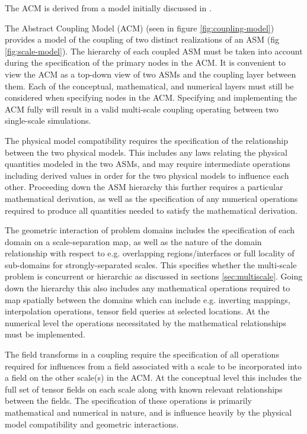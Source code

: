 \documentclass[review]{siamart1116}
\begin{document}
The ACM is derived from a model initially discussed in \cite{shephard2010component}.

The Abstract Coupling Model (ACM) (seen in figure \ref{fig:coupling-model}) provides a model of the coupling of two distinct realizations of an ASM (fig \ref{fig:scale-model}). The hierarchy of each coupled ASM must be taken into account during the specification of the primary nodes in the ACM. It is convenient to view the ACM as a top-down view of two ASMs and the coupling layer between them. Each of the conceptual, mathematical, and numerical layers must still be considered when specifying nodes in the ACM. Specifying and implementing the ACM fully will result in a valid multi-scale coupling operating between two single-scale simulations.

The physical model compatibility requires the specification of the relationship between the two physical models. This includes any laws relating the physical quantities modeled in the two ASMs, and may require intermediate operations including derived values in order for the two physical models to influence each other. Proceeding down the ASM hierarchy this further requires a particular mathematical derivation, as well as the specification of any numerical operations required to produce all quantities needed to satisfy the mathematical derivation.

The geometric interaction of problem domains includes the specification of each domain on a scale-separation map, as well as the nature of the domain relationship with respect to e.g. overlapping regions/interfaces or full locality of sub-domains for strongly-separated scales. This specifies whether the multi-scale problem is concurrent or hierarchic as discussed in sections \ref{sec:multiscale}. Going down the hierarchy this also includes any mathematical operations required to map spatially between the domains which can include e.g. inverting mappings, interpolation operations, tensor field queries at selected locations. At the numerical level the operations necessitated by the mathematical relationships must be implemented.

The field transforms in a coupling require the specification of all operations required for influences from a field associated with a scale to be incorporated into a field on the other scale(s) in the ACM. At the conceptual level this includes the full set of tensor fields on each scale along with known relevant relationships between the fields. The specification of these operations is primarily mathematical and numerical in nature, and is influence heavily by the physical model compatibility and geometric interactions.
\end{document}

